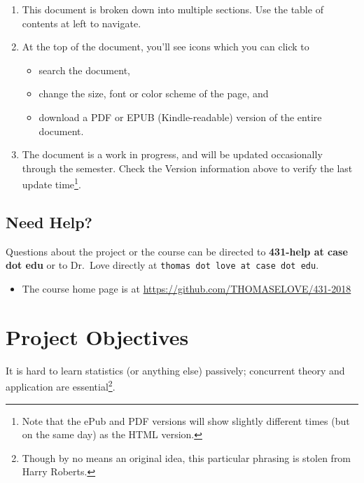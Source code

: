 \documentclass[]{book}
\providecommand{\tightlist}{%
  \setlength{\itemsep}{0pt}\setlength{\parskip}{0pt}}
\let\rmarkdownfootnote\footnote%
\def\footnote{\protect\rmarkdownfootnote}
\theoremstyle{definition}
\theoremstyle{definition}
\theoremstyle{definition}
\theoremstyle{remark}
\begin{document}
\begin{enumerate}
\def\labelenumi{\arabic{enumi}.}
\tightlist
\item
  This document is broken down into multiple sections. Use the table of
  contents at left to navigate.
\item
  At the top of the document, you'll see icons which you can click to

  \begin{itemize}
  \tightlist
  \item
    search the document,
  \item
    change the size, font or color scheme of the page, and
  \item
    download a PDF or EPUB (Kindle-readable) version of the entire
    document.
  \end{itemize}
\item
  The document is a work in progress, and will be updated occasionally
  through the semester. Check the Version information above to verify
  the last update time\footnote{Note that the ePub and PDF versions will
    show slightly different times (but on the same day) as the HTML
    version.}.
\end{enumerate}

\hypertarget{need-help}{%
\section*{Need Help?}\label{need-help}}

Questions about the project or the course can be directed to
\textbf{431-help at case dot edu} or to Dr.~Love directly at
\texttt{thomas\ dot\ love\ at\ case\ dot\ edu}.

\begin{itemize}
\tightlist
\item
  The course home page is at
  \url{https://github.com/THOMASELOVE/431-2018}
\end{itemize}

\hypertarget{project-objectives}{%
\chapter{Project Objectives}\label{project-objectives}}

It is hard to learn statistics (or anything else) passively; concurrent
theory and application are essential\footnote{Though by no means an
  original idea, this particular phrasing is stolen from Harry Roberts.}.
\end{document}
